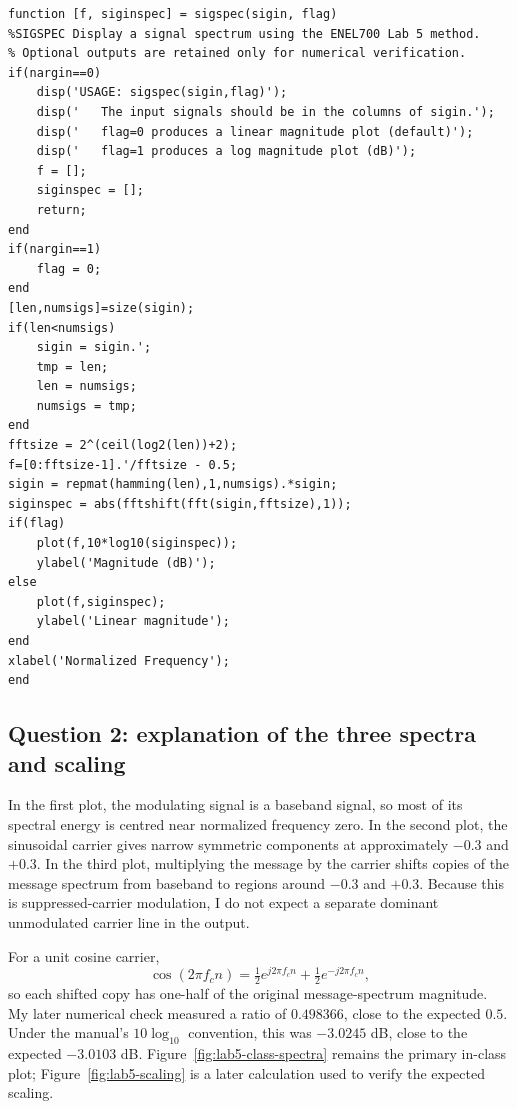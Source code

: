 \documentclass[11pt,a4paper]{article}
\begin{document}
\begin{lstlisting}[style=matlab,caption={My completed Lab 5 \texttt{sigspec.m} function.}]
function [f, siginspec] = sigspec(sigin, flag)
%SIGSPEC Display a signal spectrum using the ENEL700 Lab 5 method.
% Optional outputs are retained only for numerical verification.
if(nargin==0)
    disp('USAGE: sigspec(sigin,flag)');
    disp('   The input signals should be in the columns of sigin.');
    disp('   flag=0 produces a linear magnitude plot (default)');
    disp('   flag=1 produces a log magnitude plot (dB)');
    f = [];
    siginspec = [];
    return;
end
if(nargin==1)
    flag = 0;
end
[len,numsigs]=size(sigin);
if(len<numsigs)
    sigin = sigin.';
    tmp = len;
    len = numsigs;
    numsigs = tmp;
end
fftsize = 2^(ceil(log2(len))+2);
f=[0:fftsize-1].'/fftsize - 0.5;
sigin = repmat(hamming(len),1,numsigs).*sigin;
siginspec = abs(fftshift(fft(sigin,fftsize),1));
if(flag)
    plot(f,10*log10(siginspec));
    ylabel('Magnitude (dB)');
else
    plot(f,siginspec);
    ylabel('Linear magnitude');
end
xlabel('Normalized Frequency');
end
\end{lstlisting}

\subsection{Question 2: explanation of the three spectra and scaling}
\begin{answerbox}
In the first plot, the modulating signal is a baseband signal, so most of its spectral energy is centred near normalized frequency zero. In the second plot, the sinusoidal carrier gives narrow symmetric components at approximately $-0.3$ and $+0.3$. In the third plot, multiplying the message by the carrier shifts copies of the message spectrum from baseband to regions around $-0.3$ and $+0.3$. Because this is suppressed-carrier modulation, I do not expect a separate dominant unmodulated carrier line in the output.

For a unit cosine carrier,
\[
\cos(2\pi f_c n)=\tfrac{1}{2}e^{j2\pi f_c n}+\tfrac{1}{2}e^{-j2\pi f_c n},
\]
so each shifted copy has one-half of the original message-spectrum magnitude. My later numerical check measured a ratio of $0.498366$, close to the expected $0.5$. Under the manual's $10\log_{10}$ convention, this was $-3.0245$ dB, close to the expected $-3.0103$ dB. Figure~\ref{fig:lab5-class-spectra} remains the primary in-class plot; Figure~\ref{fig:lab5-scaling} is a later calculation used to verify the expected scaling.
\end{answerbox}
\end{document}
